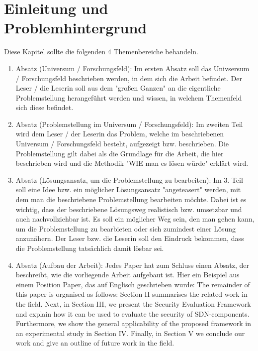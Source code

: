 

\chapter{Einleitung und Problemhintergrund}\label{cha:introduction}

Diese Kapitel sollte die folgenden 4 Themenbereiche behandeln.

\begin{enumerate}
    \item Absatz (Universum / Forschungsfeld): Im ersten Absatz soll das Univsersum / Forschungsfeld beschrieben werden, in dem sich die Arbeit befindet. Der Leser / die Leserin soll aus dem "großen Ganzen" an die eigentliche Problemstellung herangeführt werden und wissen, in welchem Themenfeld sich diese befindet.

    \item Absatz (Problemstellung im Universum / Forschungsfeld): Im zweiten Teil wird dem Leser / der Leserin das Problem, welche im beschriebenen Universum / Forschungsfeld besteht, aufge\-zeigt bzw. beschrieben. Die Problemstellung gilt dabei als die Grundlage für die Arbeit, die hier beschrieben wird und die Methodik "WIE man es lösen würde" erklärt wird.

    \item Absatz (Lösungsansatz, um die Problemstellung zu bearbeiten): Im 3. Teil soll eine Idee bzw. ein möglicher Lösungsansatz "angeteasert" werden, mit dem man die beschriebene Problemstellung bearbeiten möchte. Dabei ist es wichtig, dass der beschriebene Lösungsweg realistisch bzw. umsetzbar und auch nachvollziehbar ist. Es soll ein möglicher Weg sein, den man gehen kann, um die Problemstellung zu bearbieten oder sich zumindest einer Lösung anzunähern. Der Leser bzw. die Leserin soll den Eindruck bekommen, dass die Problemstellung tatsächlich damit lösbar sei.

    \item Absatz (Aufbau der Arbeit): Jedes Paper hat zum Schluss einen Absatz, der beschreibt, wie die vorliegende Arbeit aufgebaut ist. Hier ein Beispiel aus einem Position Paper, das auf Englisch geschrieben wurde:
          The remainder of this paper is organised as follows: Section II summarises the related work in the field. Next, in Section III, we present the Security Evaluation Framework and explain how it can be used to evaluate the security of SDN-components. Furthermore, we show the general applicability of the proposed framework in an experimental study in Section IV. Finally, in Section V we conclude our work and give an outline of future work in the field.
\end{enumerate}

